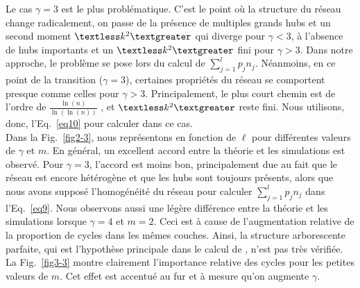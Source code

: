 Le cas $\gamma=3$ est le plus problématique. C'est le point où la structure du réseau change radicalement, on passe de la présence de multiples grands hubs et un second moment  $\textless k^2 \textgreater$ qui diverge pour $\gamma<3$, à l'absence de hubs importants et un $\textless k^2  \textgreater$ fini pour $\gamma>3$.
Dans notre approche, le problème se pose lors du calcul de $\sum_{j=1}^{l}p_jn_j$. Néanmoins, en ce point de la transition ($\gamma=3$), certaines propriétés du réseau se comportent presque comme celles pour $\gamma>3$.
Principalement, le plus court chemin est de l'ordre de  $\frac {\ln(n)}{\ln(\ln(n))}$ \cite{Bollobas-Riordan2004}, et $\textless k^2  \textgreater$ reste fini. Nous  utilisons, donc, l'Eq.~\eqref{eq10} pour calculer \nl dans ce cas. \\
Dans la Fig.~\ref{fig2-3}, nous représentons \nl en fonction de $\ell$ pour différentes valeurs de $\gamma$ et $m$. En général, un excellent accord entre la théorie et les simulations est observé. Pour $\gamma=3$, l'accord est moins bon, principalement due au fait que le réseau est encore hétérogène et que les hubs sont toujours présents, alors que nous avons supposé l'homogénéité du réseau pour calculer $\sum_{j=1}^{l} p_jn_j$ dans l'Eq.~\eqref{eq9}. Nous observons aussi une légère  différence  entre la théorie et les simulations lorsque $\gamma=4$ et $m=2$. Ceci est à cause de l'augmentation relative de la proportion de cycles dans les mêmes couches. Ainsi, la structure arborescente parfaite, qui est l'hypothèse principale dans le calcul de \nl, n'est pas très vérifiée. La Fig.~\ref{fig3-3} montre clairement l'importance relative des cycles pour les petites valeurs de $m$. Cet effet est accentué au fur et à mesure qu'on augmente $\gamma$.\\

